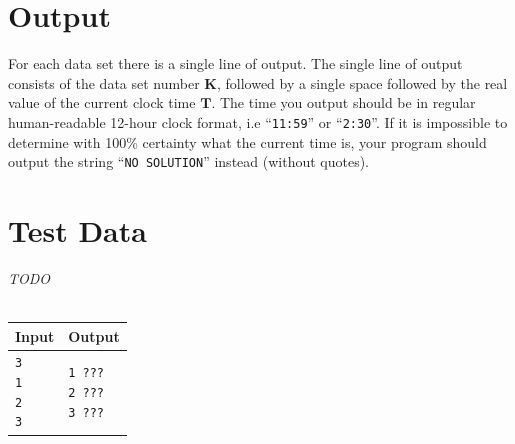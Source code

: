 \documentclass[a4paper,11pt,oneside]{article}
\begin{document}
\section{Output}
For each data set there is a single line of output. The single line of output
consists of the data set number $\boldsymbol{K}$, followed by a single space
followed by the real value of the current clock time $\boldsymbol{T}$. The time you output
should be in regular human-readable 12-hour clock format, i.e ``\texttt{11:59}''
or ``\texttt{2:30}''. If it is impossible to determine with 100\% certainty
what the current time is, your program should output the string ``\texttt{NO SOLUTION}''
instead (without quotes).

\section{Test Data}
\emph{TODO}\\\\
\begin{tabularx}{\textwidth}{|X|X|}
	\hline
	Input & Output \\ \hline
	\parbox[t]{5cm}{
	\texttt{3\\
			1\\
			2\\
			3\\
	}} & \parbox[t]{5cm}{
	\texttt{1 ???\\
			2 ???\\
			3 ???\\
	}}\\
	\hline
\end{tabularx}
\end{document}

